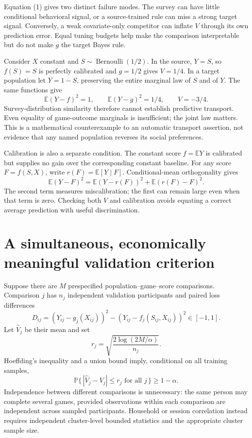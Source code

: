 \documentclass[11pt]{article}
\newcommand{\E}{\mathbb{E}}
\newcommand{\Pp}{\mathbb{P}}
\begin{document}
Equation (1) gives two distinct failure modes. The survey can have little
conditional behavioral signal, or a source-trained rule can miss a strong
target signal. Conversely, a weak covariate-only competitor can inflate
$V$ through its own prediction error. Equal tuning budgets help make the
comparison interpretable but do not make $g$ the target Bayes rule.

Consider $X$ constant and $S\sim\operatorname{Bernoulli}(1/2)$. In the source,
$Y=S$, so $f(S)=S$ is perfectly calibrated and $g=1/2$ gives $V=1/4$.
In a target population let $Y=1-S$, preserving the entire marginal law of
$S$ and of $Y$. The same functions give
\[
 \E(Y-f)^2=1,\qquad \E(Y-g)^2=1/4,\qquad V=-3/4.
\]
Survey-distribution similarity therefore cannot establish predictive
transport. Even equality of game-outcome marginals is insufficient; the
joint law matters. This is a mathematical counterexample to an automatic
transport assertion, not evidence that any named population reverses its
social preferences.

Calibration is also a separate condition. The constant score $f=\E Y$ is
calibrated but supplies no gain over the corresponding constant baseline.
For any score $F=f(S,X)$, write $r(F)=\E[Y\mid F]$. Conditional-mean
orthogonality gives
\[
 \E(Y-F)^2=\E(Y-r(F))^2+\E(r(F)-F)^2.                       \tag{2}
\]
The second term measures miscalibration; the first can remain large even
when that term is zero. Checking both $V$ and calibration avoids equating a
correct average prediction with useful discrimination.

\section{A simultaneous, economically meaningful validation criterion}
Suppose there are $M$ prespecified population--game--score comparisons.
Comparison $j$ has $n_j$ independent validation participants and paired
loss differences
\[
 D_{ij}=(Y_{ij}-g_j(X_{ij}))^2-(Y_{ij}-f_j(S_{ij},X_{ij}))^2\in[-1,1].
\]
Let $\widehat V_j$ be their mean and set
\[
 r_j=\sqrt{\frac{2\log(2M/\alpha)}{n_j}}.
\]
Hoeffding's inequality and a union bound imply, conditional on all training
samples,
\[
 \Pp\{\,|\widehat V_j-V_j|\le r_j\text{ for all }j\,\}\ge1-\alpha.
                                                               \tag{3}
\]
Independence between different comparisons is unnecessary: the same person
may complete several games, provided observations within each comparison
are independent across sampled participants. Household or session
correlation instead requires independent cluster-level bounded statistics
and the appropriate cluster sample size.
\end{document}
